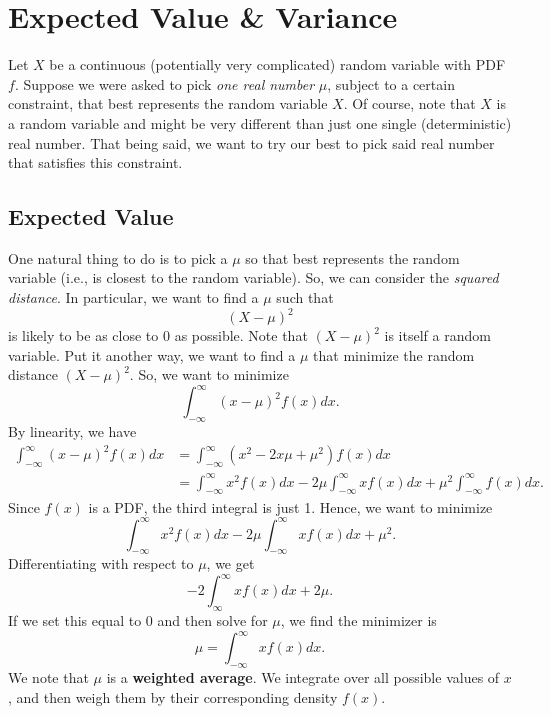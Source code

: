 \section{Expected Value \& Variance}
Let $X$ be a continuous (potentially very complicated) random variable with PDF $f$. Suppose we were asked to pick \emph{one real number} $\mu$, subject to a certain constraint, that best represents the random variable $X$. Of course, note that $X$ is a random variable and might be very different than just one single (deterministic) real number. That being said, we want to try our best to pick said real number that satisfies this constraint.

\subsection{Expected Value}
One natural thing to do is to pick a $\mu$ so that best represents the random variable (i.e., is closest to the random variable). So, we can consider the \emph{squared distance}. In particular, we want to find a $\mu$ such that \[(X - \mu)^2\] is likely to be as close to 0 as possible. Note that $(X - \mu)^2$ is itself a random variable. Put it another way, we want to find a $\mu$ that minimize the random distance $(X - \mu)^2$. So, we want to minimize 
\[\int_{-\infty}^{\infty} (x - \mu)^2 f(x) dx.\]
By linearity, we have 
\begin{equation*}
    \begin{aligned}
        \int_{-\infty}^{\infty} (x - \mu)^2 f(x) dx &= \int_{-\infty}^{\infty} (x^2 - 2x\mu + \mu^2) f(x) dx \\ 
            &= \int_{-\infty}^{\infty} x^2 f(x) dx - 2\mu \int_{-\infty}^{\infty} xf(x) dx + \mu^2 \int_{-\infty}^{\infty} f(x) dx. 
    \end{aligned}
\end{equation*} 
Since $f(x)$ is a PDF, the third integral is just 1. Hence, we want to minimize 
\[\int_{-\infty}^{\infty} x^2 f(x) dx - 2\mu \int_{-\infty}^{\infty} xf(x) dx + \mu^2.\]
Differentiating with respect to $\mu$, we get 
\[-2 \int_{\infty}^{\infty} xf(x) dx + 2\mu.\]
If we set this equal to 0 and then solve for $\mu$, we find the minimizer is 
\[\mu = \int_{-\infty}^{\infty} xf(x) dx.\]
We note that $\mu$ is a \textbf{weighted average}. We integrate over all possible values of $x$, and then weigh them by their corresponding density $f(x)$. 

